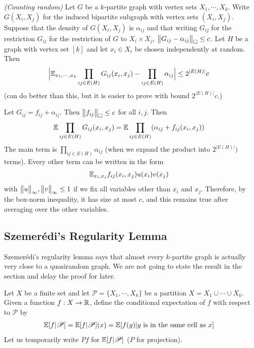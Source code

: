 \documentclass[10pt,a4paper]{report}
\newenvironment{proof}
{\begin{changemargin}{1cm}{0.5cm}
	}%
	{\end{changemargin}
}
\begin{document}
 \emph{(Counting random)} Let $G$ be a $k$-partite graph with vertex sets $X_1, \cdots, X_k$. Write $G(X_i, X_j)$ for the induced bipartite subgraph with vertex sets $(X_i, X_j)$. Suppose that the density of $G(X_i, X_j)$ is $\alpha_{ij}$ and that writing $G_{ij}$ for the restriction $G_{ij}$ for the restriction of $G$ to $X_i \times X_j$, $\bigl\lVert G_{ij} - \alpha_{ij}\bigr\rVert_{\tiny{\square}} \leq c$. Let $H$ be a graph with vertex set $[k]$ and let $x_i \in X_i$ be chosen independently at random. Then
\begin{align*}
\Big| \mathbb{E}_{x_1, \cdots, x_k} \prod_{ij \in E(H)} G_{ij} (x_i, x_j) - \prod_{ij\in E(H)} \alpha_{ij} \Big| \leq 2^{|E(H)|} c
\end{align*}
(can do better than this, but it is easier to prove with bound $2^{|E(H)|} c$.)
\begin{proof}
\pf Let $G_{ij} = f_{ij} + \alpha_{ij}$. Then $\bigl\lVert f_{ij}\bigr\rVert_{\tiny{\square}} \leq c$ for all $i,j$. Then
\begin{align*}
\mathbb{E} \prod_{ij \in E(H)} G_{ij}(x_i,x_j) = \mathbb{E} \prod_{ij\in E(H)} (\alpha_{ij} + f_{ij}(x_i, x_j))
\end{align*}
The main term is $\prod_{ij\in E(H)} \alpha_{ij}$ (when we expand the product into $2^{|E(H)|})$ terms). Every other term can be written in the form
\begin{align*}
\mathbb{E}_{x_i, x_j} f_{ij}(x_i,x_j) u(x_i) v(x_j)
\end{align*}
with $\bigl\lVert u\bigr\rVert_{\infty},\bigl\lVert v\bigr\rVert_{\infty} \leq 1$ if we fix all variables other than $x_i$ and $x_j$. Therefore, by the box-norm inequality, it has size at most $c$, and this remains true after averaging over the other variables. 

\eop
\end{proof}
\s

\subsection*{Szemer\'{e}di's Regularity Lemma}

Szemer\'{e}di's regularity lemma says that almost every $k$-partite graph is actually very close to a quasirandom graph. We are not going to state the result in the section and delay the proof for later.
\s

Let $X$ be a finite set and let $\mathscr{P}= \{ X_1, \cdots, X_k \}$ be a partition $X=X_1 \cup \cdots \cup X_k$. Given a function $f: X\rightarrow \mathbb{R}$, define the conditional expectation of $f$ with respect to $\mathscr{P}$ by
\begin{align*}
\mathbb{E} [f | \mathscr{P}] = \mathbb{E}[f|\mathscr{P}](x) = \mathbb{E}[f(y) | y \text{ is in the same cell as } x]
\end{align*}
Let us temporarily write $Pf$ for $\mathbb{E}[f|\mathscr{P}]$ ($P$ for projection).
\s
\end{document}
